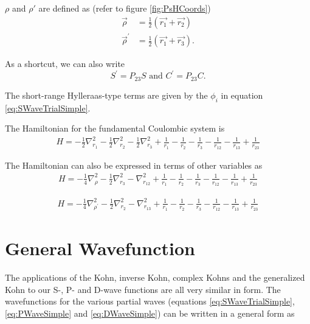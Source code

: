 \documentclass[Dissertation.tex]{subfiles}
\begin{document}
$\rho$ and $\rho'$ are defined as (refer to figure \ref{fig:PsHCoords})
\begin{subequations}
\begin{align}
\vec{\rho} &= \frac{1}{2}\left(\vec{r_1} + \vec{r_2}\right) \label{eq:RhoDef}\\
\vec{\rho}^\prime &= \frac{1}{2}\left(\vec{r_1} + \vec{r_3}\right) \label{eq:RhopDef}.
\end{align}
\end{subequations}

\noindent As a shortcut, we can also write
\begin{equation}
S^\prime = P_{23} S \text{ and } C^\prime = P_{23} C.
\label{eq:SCprime}
\end{equation}

The short-range Hylleraas-type terms are given by the $\phi_i$ in equation \ref{eq:SWaveTrialSimple}. 

The Hamiltonian for the fundamental Coulombic system is
\begin{align}
H = -\frac{1}{2} \nabla_{r_1}^2 - \frac{1}{2} \nabla_{r_2}^2 - \frac{1}{2} \nabla_{r_3}^2 + \frac{1}{r_1} - \frac{1}{r_2} - \frac{1}{r_3} - \frac{1}{r_{12}} -\frac {1}{r_{13}} + \frac{1}{r_{23}}\label{Hamiltonian1}
\end{align}

\noindent The Hamiltonian can also be expressed in terms of other variables as
\begin{align}
H = -\frac{1}{4} \nabla_{\rho}^2 - \frac{1}{2} \nabla_{r_3}^2 - \nabla_{r_{12}}^2 + \frac{1}{r_1} - \frac{1}{r_2} - \frac{1}{r_3} - \frac{1}{r_{12}} - \frac{1}{r_{13}} + \frac{1}{r_{23}}
\label{Hamiltonian2}
\end{align}

\begin{align}
H = -\frac{1}{4} \nabla_{\rho^\prime}^2 - \frac{1}{2} \nabla_{r_2}^2 - \nabla_{r_{13}}^2 + \frac{1}{r_1} - \frac{1}{r_2} - \frac{1}{r_3} - \frac{1}{r_{12}} - \frac{1}{r_{13}} + \frac{1}{r_{23}}
\label{Hamiltonian3}
\end{align}


\section{General Wavefunction}

The applications of the Kohn, inverse Kohn, complex Kohns and the generalized Kohn to our S-, P- and D-wave functions are all very similar in form. The wavefunctions for the various partial waves (equations \ref{eq:SWaveTrialSimple}, \ref{eq:PWaveSimple} and \ref{eq:DWaveSimple}) can be written in a general form as
\end{document}
